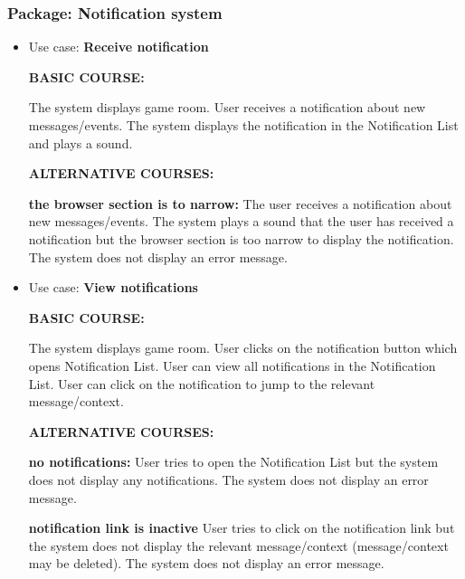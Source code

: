 \documentclass[]{VUMIFTemplateClass}
\begin{document}
\subsubsection{Package: Notification system}
\begin{itemize}
    \item 
    Use case: \textbf{Receive notification}

    \textbf{BASIC COURSE:}

    The system displays game room. User receives a notification about new messages/events. The system displays the notification in the Notification List and plays a sound. 

    \textbf{ALTERNATIVE COURSES:}

    \textbf{the browser section is to narrow:}
    The user receives a notification about new messages/events. The system plays a sound that the user has received a notification but the browser section is too narrow to display the notification. The system does not display an error message.

    \item 
    Use case: \textbf{View notifications}

    \textbf{BASIC COURSE:}

    The system displays game room. User clicks on the notification button which opens Notification List. User can view all notifications in the Notification List. User can click on the notification to jump to the relevant message/context.

    \textbf{ALTERNATIVE COURSES:}

    \textbf{no notifications:}
    User tries to open the Notification List but the system does not display any notifications. The system does not display an error message.

    \textbf{notification link is inactive}
    User tries to click on the notification link but the system does not display the relevant message/context (message/context may be deleted). The system does not display an error message.

\end{itemize}
\end{document}
